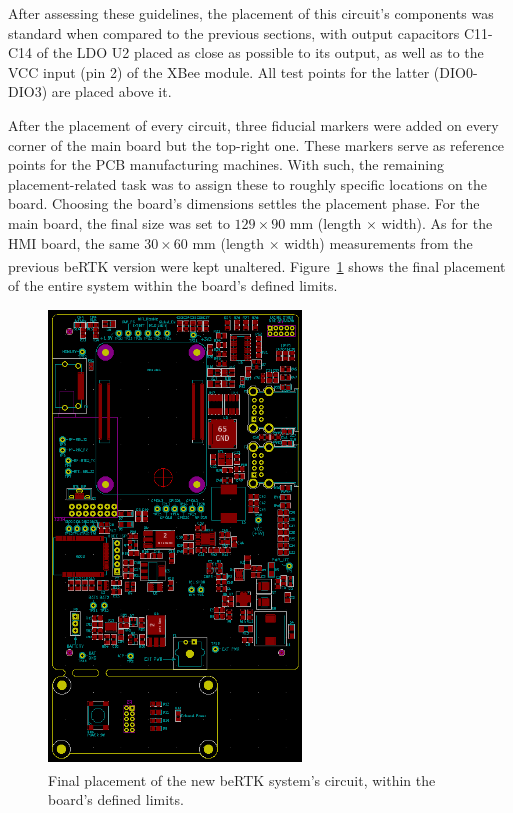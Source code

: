 After assessing these guidelines, the placement of this circuit's components was standard when compared to the previous sections, with output capacitors C11-C14 of the LDO U2 placed as close as possible to its output, as well as to the VCC input (pin 2) of the XBee module. All test points for the latter (DIO0-DIO3) are placed above it.


After the placement of every circuit, three fiducial markers were added on every corner of the main board but the top-right one. These markers serve as reference points for the PCB manufacturing machines.
With such, the remaining placement-related task was to assign these to roughly specific locations on the board. Choosing the board's dimensions settles the placement phase. For the main board, the final size was set to $129 \times 90$ mm (length $\times$ width). As for the HMI board, the same $30 \times 60$ mm (length $\times$ width) measurements from the previous beRTK\textsuperscript{\textregistered} version were kept unaltered. Figure~\ref{fig:placement_FULL} shows the final placement of the entire system within the board's defined limits.

\begin{figure}[h]
	\centering
	\includegraphics[width=0.6\textwidth]{Chapters/Figures/chapter5/placement_FULL.png}
	\caption{Final placement of the new beRTK\textsuperscript{\textregistered} system's circuit, within the board's defined limits.}
	\label{fig:placement_FULL}
\end{figure}


